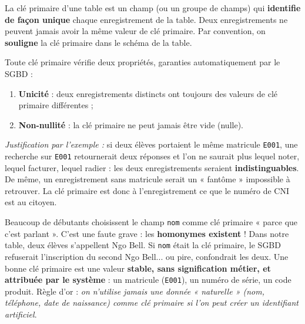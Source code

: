 \documentclass[11pt]{article}
\newcommand{\cle}[1]{{\popxbold\color{popdark}#1}}
\begin{document}
\begin{definition}
La \cle{clé primaire} d'une table est un champ (ou un groupe de champs) qui \textbf{identifie de façon unique} chaque enregistrement de la table. Deux enregistrements ne peuvent jamais avoir la même valeur de clé primaire. Par convention, on \textbf{souligne} la clé primaire dans le schéma de la table.
\end{definition}

\begin{propriete}
Toute clé primaire vérifie deux propriétés, garanties automatiquement par le SGBD :
\begin{enumerate}
\item \textbf{Unicité} : deux enregistrements distincts ont toujours des valeurs de clé primaire différentes ;
\item \textbf{Non-nullité} : la clé primaire ne peut jamais être vide (nulle).
\end{enumerate}
\emph{Justification par l'exemple :} si deux élèves portaient le même matricule \texttt{E001}, une recherche sur \texttt{E001} retournerait deux réponses et l'on ne saurait plus lequel noter, lequel facturer, lequel radier : les deux enregistrements seraient \textbf{indistinguables}. De même, un enregistrement sans matricule serait un « fantôme » impossible à retrouver. La clé primaire est donc à l'enregistrement ce que le numéro de CNI est au citoyen.
\end{propriete}

\begin{attention}
Beaucoup de débutants choisissent le champ \texttt{nom} comme clé primaire « parce que c'est parlant ». C'est une faute grave : les \textbf{homonymes existent} ! Dans notre table, deux élèves s'appellent Ngo Bell. Si \texttt{nom} était la clé primaire, le SGBD refuserait l'inscription du second Ngo Bell... ou pire, confondrait les deux. Une bonne clé primaire est une valeur \textbf{stable, sans signification métier, et attribuée par le système} : un matricule (\texttt{E001}), un numéro de série, un code produit. Règle d'or : \emph{on n'utilise jamais une donnée « naturelle » (nom, téléphone, date de naissance) comme clé primaire si l'on peut créer un identifiant artificiel}.
\end{attention}
\end{document}
